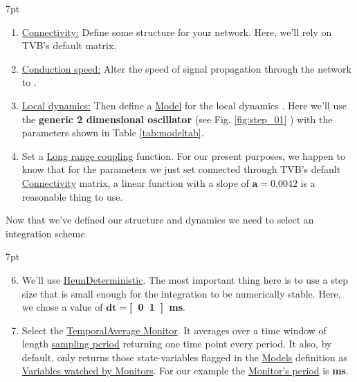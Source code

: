 \documentclass{tufte-handout}
\newenvironment{simulation}{%
  \def\FrameCommand{%
    \hspace{1pt}%
    {\color{ForestGreen}\vrule width 2pt}%
    {\color{simulationshade}\vrule width 4pt}%
    \colorbox{simulationshade}%
  }%
  \MakeFramed{\advance\hsize-\width\FrameRestore}%
  \noindent\hspace{-4.55pt}%
  \begin{adjustwidth}{}{7pt}%
  \vspace{2pt}\vspace{2pt}%
}
{%
  \vspace{2pt}\end{adjustwidth}\endMakeFramed%
}
\begin{document}
\begin{simulation}
\begin{enumerate}
\item \underline{Connectivity:} Define some structure for your network. Here, we'll rely on TVB's default  matrix. 

\item \underline{Conduction speed:} Alter the speed of signal propagation through the network to \textbf{}. 

\item \underline{Local dynamics:} Then define a \underline{Model} for the local dynamics . Here we'll use the \textbf{generic 2 dimensional oscillator} (see Fig. \ref{fig:step_01} ) with the parameters shown in Table \ref{tab:modeltab}.

\item Set a \underline{Long range coupling} function. For our present purposes, we happen to know that for the parameters we just set connected through TVB's default \underline{Connectivity} matrix, a linear function with a slope of $\mathbf{a=0.0042}$ is a reasonable thing to use. 

\end{enumerate}
\end{simulation}

Now that we've defined our structure and dynamics we need to select an integration scheme. 

\begin{simulation}
\begin{enumerate}[resume]
  \setcounter{enumi}{5}

\item We'll use \underline{HeunDeterministic}. The most important thing here is to use a step size that is small enough for the integration to be numerically stable. Here, we chose a value of $\mathbf{dt=}$\textbf{\unit[0.1]{ms}}.

\item  Select the \underline{TemporalAverage Monitor}. It averages over a time window of length \underline{sampling period} returning one time point every period. It also, by default, only returns those state-variables flagged in the \underline{Models} definition as \underline{Variables watched by Monitors}. For our example the \underline{Monitor's period} is \textbf{\unit[1]{ms}}. 
\end{enumerate}
\end{simulation}
\end{document}
